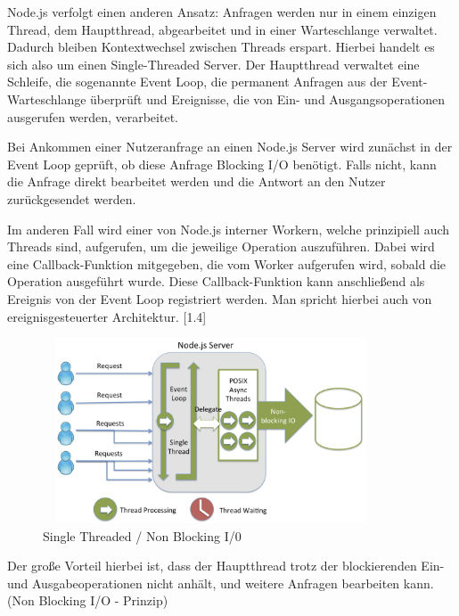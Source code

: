 \newpage

\noindent
Node.js verfolgt einen anderen Ansatz: Anfragen werden nur in einem einzigen Thread, dem Hauptthread, abgearbeitet und in einer Warteschlange verwaltet. Dadurch bleiben Kontextwechsel zwischen Threads erspart. Hierbei handelt es sich also um einen Single-Threaded Server. Der Hauptthread verwaltet eine Schleife, die sogenannte Event Loop, die permanent Anfragen aus der Event-Warteschlange überprüft und Ereignisse, die von Ein- und Ausgangsoperationen ausgerufen werden, verarbeitet.
\newline

\noindent
Bei Ankommen einer Nutzeranfrage an einen Node.js Server wird zunächst in der Event Loop geprüft, ob diese Anfrage Blocking I/O benötigt. Falls nicht, kann die Anfrage direkt bearbeitet werden und die Antwort an den Nutzer zurückgesendet werden. 
\newline

\noindent
Im anderen Fall wird einer von Node.js interner Workern, welche prinzipiell auch Threads sind, aufgerufen, um die jeweilige Operation auszuführen. Dabei wird eine Callback-Funktion mitgegeben, die vom Worker aufgerufen wird, sobald die Operation ausgeführt wurde. Diese Callback-Funktion kann anschließend als Ereignis von der Event Loop registriert werden. Man spricht hierbei auch von ereignisgesteuerter Architektur. [1.4]
\newline
 
\begin{figure}[tbt]
\centering
\includegraphics[width=10cm, height = 5.5cm]{images/nodejs_nodethreading.png}
\caption[Single Threaded / Non Blocking I/0]{Single Threaded / Non Blocking I/0 \cite{Node1.1}}
\end{figure}
 

\noindent
Der große Vorteil hierbei ist, dass der Hauptthread trotz der blockierenden Ein- und Aus\-gabeoperationen nicht anhält, und weitere Anfragen bearbeiten kann. (Non Blocking I/O - Prinzip) 
\newline

